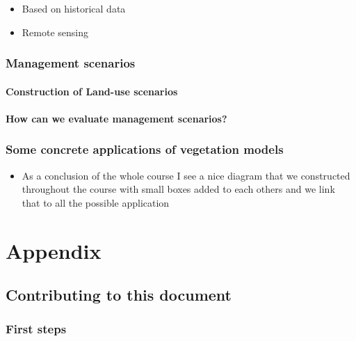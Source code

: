 \documentclass[12pt,oneside]{book}
\providecommand{\tightlist}{%
  \setlength{\itemsep}{0pt}\setlength{\parskip}{0pt}}
\begin{document}
\begin{itemize}
\tightlist
\item
  Based on historical data
\item
  Remote sensing
\end{itemize}

\section{Management scenarios}\label{management-scenarios}

\subsection{Construction of Land-use
scenarios}\label{construction-of-land-use-scenarios-1}

\subsection{How can we evaluate management
scenarios?}\label{how-can-we-evaluate-management-scenarios}

\section{Some concrete applications of vegetation
models}\label{some-concrete-applications-of-vegetation-models}

\begin{itemize}
\tightlist
\item
  As a conclusion of the whole course I see a nice diagram that we
  constructed throughout the course with small boxes added to each
  others and we link that to all the possible application
\end{itemize}

\part{Appendix}\label{part-appendix}

\chapter*{Contributing to this
document}\label{contributing-to-this-document}

\section*{First steps}\label{first-steps}
\end{document}
